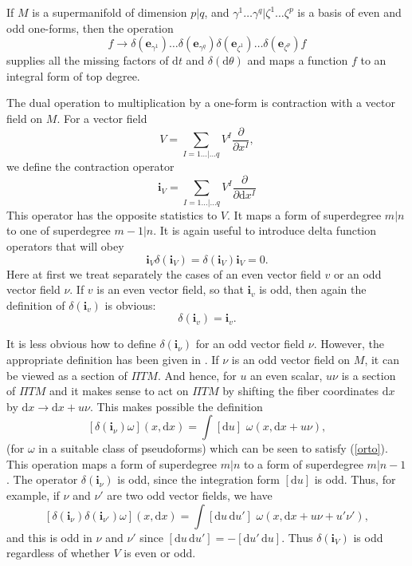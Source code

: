 \documentclass[11pt,a4paper]{article}
\def\d{{\mathrm d}}
\def\e{{\mathbf e}}
\def\i{{\mathbf i}}
\def\Pi{\varPi}
\begin{document}
If $M$ is a supermanifold of dimension $p|q$, and $\gamma^1\dots\gamma^q|\zeta^1\dots\zeta^p$ is a basis of even and odd one-forms,
then the operation
\begin{equation}\label{frobz} f\to \delta(\e_{\gamma^1})\dots \delta(\e_{\gamma^q})\delta(\e_{\zeta^1})\dots \delta(\e_{\zeta^p}) f \end{equation}
supplies all the missing factors of $\d t$ and $\delta(\d\theta)$ and
maps a function $f$ to an integral form of top degree.

The dual operation to multiplication by a one-form is contraction with a vector field on $M$.  For a vector field 
\begin{equation}\label{ork}V=\sum_{I=1\dots|\dots q} V^I\frac{\partial}{\partial x^I},\end{equation}
 we define the contraction operator
\begin{equation}\label{dork}\i_V=\sum_{I=1\dots|\dots q} V^I\frac{\partial}{\partial \d x^I}\end{equation}
This operator has the opposite statistics to $V$.  It maps a form of superdegree $m|n$ to one of superdegree $m-1|n$.
It is again useful to introduce delta function operators that will obey
\begin{equation}\label{orto}\i_V\delta(\i_V)=\delta(\i_V)\i_V=0.\end{equation}
Here at first we treat separately the cases of an even vector field $v$ or an odd vector field $\nu$.
If $v$ is an even vector field, so that $\i_v$ is odd, then again the definition of $\delta(\i_v)$ is obvious:
\begin{equation}\label{zoto}\delta(\i_v)=\i_v.  \end{equation}

It is less obvious how to define $\delta(\i_\nu)$ for an odd vector field $\nu$.  However, the appropriate definition has been given in \cite{Beltwo}.
If $\nu$ is an odd vector field on $M$, it can be viewed as a section of ${\Pi} TM$.  And hence, for $u$ an even scalar, $u\nu$ is a section of ${\Pi} TM$
and it makes sense to act on ${\Pi} TM$ by shifting the fiber coordinates $\d x$ by $\d x \to \d x+ u\nu$.  This makes possible the definition
\begin{equation}\label{ohon}[\delta(\i_\nu)\omega](x,\d x)= \int[\d u]\,\, \omega(x,\d x + u\nu),\end{equation}
(for $\omega$ in a suitable class of pseudoforms)
which can be seen to satisfy (\ref{orto}).
This operation maps a form of superdegree $m|n$ to a form of superdegree $m|n-1$.  The operator $\delta(\i_\nu)$ is odd, since the integration form $[\d u]$ is odd.
Thus, for example, if $\nu$ and $\nu'$ are two odd vector fields, we have
\begin{equation}\label{bohon}[\delta(\i_\nu)\delta(\i_{\nu'})\omega](x,\d x)=\int [\d u \,\d u']\,\,\omega(x,\d x+ u\nu+u'\nu'),\end{equation}
and this is odd in $\nu$ and $\nu'$ since $[\d u \,\d u']=-[\d u'\,\d u]$.  Thus $\delta(\i_V)$ is odd regardless of whether $V$ is even or odd.
\end{document}

